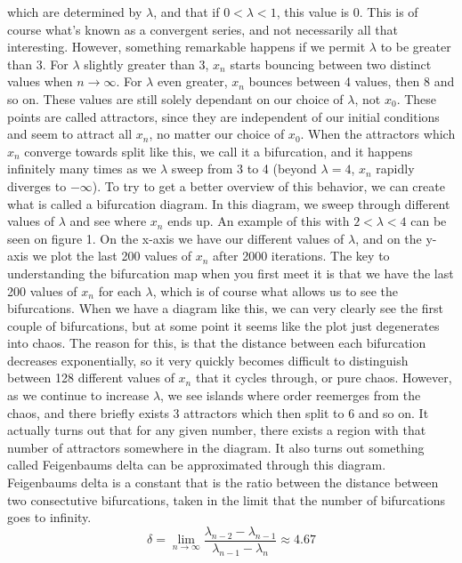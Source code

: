 \documentclass[12pt,oneside,a4paper]{article}
\numberwithin{equation}{section}
\begin{document}
{{{{which are determined by $\lambda$, and that if $0<\lambda<1$, this value is 0. This is of course what's known as a convergent series, and not necessarily all that interesting. However, something remarkable happens if we permit $\lambda$ to be greater than 3. For $\lambda$ slightly greater than 3, $x_n$ starts bouncing between two distinct values when $n \rightarrow \infty$. For $\lambda$ even greater, $x_n$ bounces between 4 values, then 8 and so on. These values are still solely dependant on our choice of $\lambda$, not $x_0$. These points are called attractors, since they are independent of our initial conditions and seem to attract all $x_n$, no matter our choice of $x_0$. When the attractors which $x_n$ converge towards split like this, we call it a bifurcation, and it happens infinitely many times as we $\lambda$ sweep from 3 to 4 (beyond $\lambda=4$, $x_n$ rapidly diverges to $-\infty$). To try to get a better overview of this behavior, we can create what is called a bifurcation diagram. In this diagram, we sweep through different values of $\lambda$ and see where $x_n$ ends up. An example of this with $2<\lambda<4$ can be seen on figure 1. On the x-axis we have our different values of $\lambda$, and on the y-axis we plot the last 200 values of $x_n$ after 2000 iterations. The key to understanding the bifurcation map when you first meet it is that we have the last 200 values of $x_n$ for each $\lambda$, which is of course what allows us to see the bifurcations. When we have a diagram like this, we can very clearly see the first couple of bifurcations, but at some point it seems like the plot just degenerates into chaos. The reason for this, is that the distance between each bifurcation decreases exponentially, so it very quickly becomes difficult to distinguish between 128 different values of $x_n$ that it cycles through, or pure chaos. However, as we continue to increase $\lambda$, we see islands where order reemerges from the chaos, and there briefly exists 3 attractors which then split to 6 and so on. It actually turns out that for any given number, there exists a region with that number of attractors somewhere in the diagram. It also turns out something called Feigenbaums delta can be approximated through this diagram. Feigenbaums delta is a constant that is the ratio between the distance between two consectutive bifurcations, taken in the limit that the number of bifurcations goes to infinity.
\begin{equation}
\delta=\lim_{n \to \infty} \frac{\lambda_{n-2} - \lambda_{n-1}}{\lambda_{n-1}-\lambda_n} \approx 4.67
\end{equation}

}}}}
\end{document}
